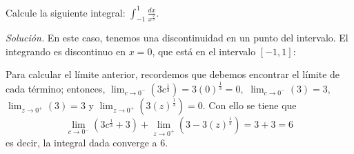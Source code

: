 

\begin{ejemplo}
\textnormal{Calcule la siguiente integral:} $\displaystyle{\int_{-1}^{1}\frac{dx}{x^{\frac{2}{3}}}}$.
\end{ejemplo}

\textit{Solución.} En este caso, tenemos una discontinuidad en un punto del intervalo. El integrando es discontinuo en $x=0$, que está en el intervalo {\small $[-1,1]$:}





Para calcular el límite anterior, recordemos que debemos encontrar el límite de cada término; entonces, {\footnotesize $\displaystyle\lim_{c\rightarrow 0^{-}}\left( 3c^{\frac{1}{3}}\right) =3(0)^{\frac{1}{3}}=0,$ $\displaystyle\lim_{c\rightarrow 0^{-}}\left( 3\right) =3,$ $\lim_{z\rightarrow 0^{+}}\left( 3\right) =3$} y {\footnotesize $ \displaystyle\lim_{z\rightarrow 0^{+}}\left( 3(z)^{\frac{1}{3}}\right) =0$.} Con ello se tiene que
\[\lim_{c\rightarrow 0^{-}}\left( 3c^{\frac{1}{3}}+3\right)
+\lim_{z\rightarrow 0^{+}}\left( 3-3(z)^{\frac{1}{3}}\right) =3+3=6
\]
es decir, la integral dada converge a $6.$

